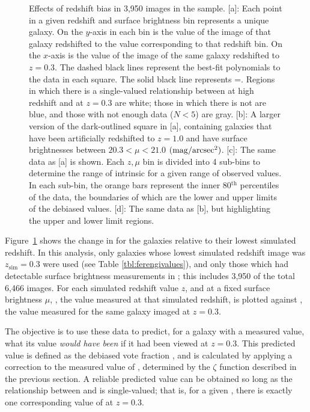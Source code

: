 \documentclass[twocolumn]{aastex6}
\begin{document}
\begin{figure}
\caption{Effects of redshift bias in 3,950 images in the \ferengi{} sample. [a]: Each point in a given redshift and surface brightness bin represents a unique galaxy. On the $y$-axis in each bin is the \ffeatures{} value of the image of that galaxy redshifted to the value corresponding to that redshift bin. On the $x$-axis is the \ffeatures{} value of the image of the same galaxy redshifted to $z=0.3$. The dashed black lines represent the best-fit polynomials to the data in each square. The solid black line represents \ffeaturesz=\ffeaturesrest. Regions in which there is a single-valued relationship between \ffeatures{} at high redshift and at $z=0.3$ are white; those in which there is not are blue, and those with not enough data ($N<5$) are gray. [b]: A larger version of the dark-outlined square in [a], containing \ferengi{} galaxies that have been artificially redshifted to $z=1.0$ and have surface brightnesses between $20.3 < \mu < 21.0$ $\rm (mag/arcsec^2)$. [c]: The same data as [a] is shown. Each $z,\mu$ bin is divided into 4 sub-bins to determine the range of intrinsic \ffeaturesrest{} for a given range of observed \ffeaturesz{} values. In each sub-bin, the orange bars represent the inner 80$^\mathrm{th}$ percentiles of the data, the boundaries of which are the lower and upper limits of the debiased values. [d]: The same data as [b], but highlighting the upper and lower limit regions.}
\label{fig:f_vs_f}
\end{figure}

Figure~\ref{fig:f_vs_f} shows the change in \ffeatures{} for the \ferengi{} galaxies relative to their lowest simulated redshift. In this analysis, only galaxies whose lowest simulated redshift image was $z_\mathrm{sim}=0.3$ were used (see Table \ref{tbl:ferengivalues}), and only those which had detectable surface brightness measurements in \sextractor; this includes 3,950 of the total 6,466 images. For each simulated redshift value $z$, and at a fixed surface brightness $\mu$, \ffeaturesz, the value measured at that simulated redshift, is plotted against \ffeaturesrest, the value measured for the same galaxy imaged at $z=0.3$. 
 
The objective is to use these data to predict, for a galaxy with a measured \ffeaturesz{} value, what its \ffeatures{} value \emph{would have been} if it had been viewed at $z=0.3$. This predicted value is defined as the debiased vote fraction \ffeaturesdebiased, and is calculated by applying a correction to the measured value of \ffeatures, determined by the $\zeta$ function described in the previous section. A reliable predicted value can be obtained so long as the relationship between \ffeaturesz{} and \ffeaturesrest{} is single-valued; that is, for a given \ffeaturesz, there is exactly one corresponding value of \ffeatures{} at $z=0.3$. 
\end{document}

